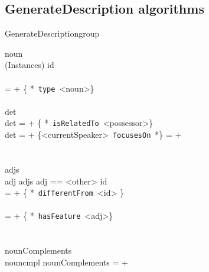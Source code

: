 \documentclass[11pt]{article}
\begin{document}
\subsection{GenerateDescription algorithms}
\label{GenerateDescription}
\begin{pseudocode}[ruled]{GenerateDescription}{group}
\label{algo|GenerateDescription}

   noun \GETS {} \\ 
   \IF {} \in (Instances) \THEN
   		\BEGIN
		id \GETS {}\\	
		\\
		\END
   \ELSE
    	 =  + \{ *\ {\tt type}\ <noun>\} \\
   
   \\
   det \GETS {} \\
   \IF det  \THEN
        =  + \{ *\ {\tt isRelatedTo}\ <possessor>\} \\
    
    \IF det  \THEN
        \BEGIN
        \IF {} \THEN 
             =  + \{<currentSpeaker>\ {\tt focusesOn}\ *\}
        \ELSE
             =  +  \\
        \END \\
   \\
   adjs \GETS {} \\
   \FOREACH adj \in adjs \DO
   	\BEGIN
   		\IF adj == <other> \THEN 
   			\BEGIN
   			id \GETS {} \\
   			 =  + \{ *\ {\tt differentFrom}\ <id> \}\\
   			\\
			\END   		
   		\ELSE
	     	 =  + \{ *\ {\tt hasFeature}\ <adj>\} \\
    \END\\
    
   \\  
   nounComplements \GETS {} \\
   \FOREACH nouncmpl \in nounComplements \DO
      =  + {}\\
   

\end{pseudocode}
\end{document}
